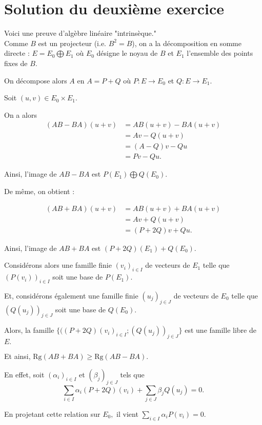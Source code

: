 \section{Solution du deuxième exercice}

Voici une preuve d'algèbre linéaire "intrinsèque."\\

Comme $B$ est un projecteur (i.e. $B^{2}=B$), on a la décomposition en somme directe : $\displaystyle E=E_{0}\bigoplus E_{1}$ où $E_{0}$ désigne le noyau de $B$ et $E_{1}$ l'ensemble des points fixes de $B.$

On décompose alors $A$ en $A=P+Q$ où $P : E\rightarrow E_{0}$ et $Q : E\rightarrow E_{1}.$

Soit $(u,v)\in E_{0}\times E_{1}.$

On a alors 
\begin{align*}
(AB-BA)(u+v) & = AB(u+v)-BA(u+v)\\
& = Av-Q(u+v)\\
& = (A-Q)v-Qu\\
& =Pv-Qu.
\end{align*}

Ainsi, l'image de $AB-BA$ est $\displaystyle P(E_{1})\bigoplus Q(E_{0}).$

De même, on obtient : 

\begin{align*}
(AB+BA)(u+v) & = AB(u+v)+BA(u+v)\\
& = Av+Q(u+v)\\
& = (P+2Q)v+Qu.
\end{align*}

Ainsi, l'image de $AB+BA$ est $\displaystyle (P+2Q)(E_{1})+Q(E_{0}).$

Considérons alors une famille finie $(v_{i})_{i\in I}$ de vecteurs de $E_{1}$ telle que $(P(v_{i}))_{i\in I}$ soit une base de $P(E_{1}).$

Et, considérons également une famille finie $(u_{j})_{j\in J}$ de vecteurs de $E_{0}$ telle que $(Q(u_{j}))_{j\in J}$ soit une base de $Q(E_{0}).$

Alors, la famille $\{((P+2Q)(v_{i})_{i\in I};(Q(u_{j}))_{j\in J}\}$ est une famille libre de $E.$

Et ainsi, $\boxed{\displaystyle \mbox{Rg}(AB+BA)\geq \mbox{Rg}(AB-BA).}$

En effet, soit $(\alpha_{i})_{i\in I}$ et $(\beta_{j})_{j\in J}$ tels que $$\sum_{i\in I}\alpha_{i}(P+2Q)(v_{i})+\sum_{j\in J}\beta_{j}Q(u_{j})=0.$$

En projetant cette relation sur $E_{0},$ il vient $\displaystyle \sum_{i\in I}\alpha_{i}P(v_{i})=0.$ 

